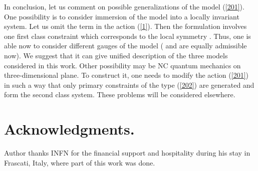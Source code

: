 \documentclass[paper a4]{article}
\begin{document}
In conclusion, let us comment on possible generalizations of the
model (\ref{201}). One possibility is to consider immersion of the model
into a locally invariant system. Let us omit the term \coordHE{}
in the action (\ref{1}). Then the formulation involves one first class
constraint which corresponds to the local symmetry
\coordHE{}. Thus, one is able now to consider different
gauges of the model (\coordHE{} and \coordHE{} are equally
admissible now). We suggest that it can give unified description of
the three models considered in this work. Other possibility may be
NC quantum mechanics on three-dimensional plane. To construct it, one
needs to modify the action (\ref{201}) in such a way that only primary
constraints of the type (\ref{202}) are generated and form the second
class system. These problems will be considered elsewhere.

\section{Acknowledgments.}
Author thanks INFN for the financial support and hospitality during
his stay in Frascati, Italy, where part of this work was done.
\end{document}
